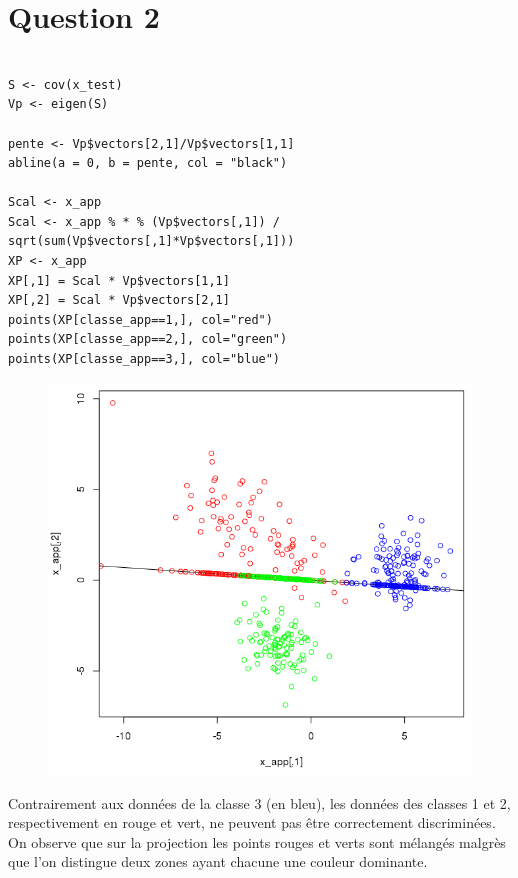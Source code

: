 \documentclass[a4paper,12pt]{report}
\begin{document}
\newpage

\section*{Question 2}

\begin{lstlisting}

S <- cov(x_test)
Vp <- eigen(S)	

pente <- Vp$vectors[2,1]/Vp$vectors[1,1]
abline(a = 0, b = pente, col = "black")

Scal <- x_app
Scal <- x_app % * % (Vp$vectors[,1]) / sqrt(sum(Vp$vectors[,1]*Vp$vectors[,1]))
XP <- x_app
XP[,1] = Scal * Vp$vectors[1,1]
XP[,2] = Scal * Vp$vectors[2,1]
points(XP[classe_app==1,], col="red")
points(XP[classe_app==2,], col="green")
points(XP[classe_app==3,], col="blue")
\end{lstlisting}

\begin{figure}[!ht]
	\center
	\includegraphics[scale=0.4]{image/q2.png}
\end{figure}

Contrairement aux données de la classe 3 (en bleu), les données des classes 1 et 2, respectivement en rouge et vert, ne peuvent pas être correctement discriminées. On observe que sur la projection les points rouges et verts sont mélangés malgrès que l'on distingue deux zones ayant chacune une couleur dominante. 
\end{document}
